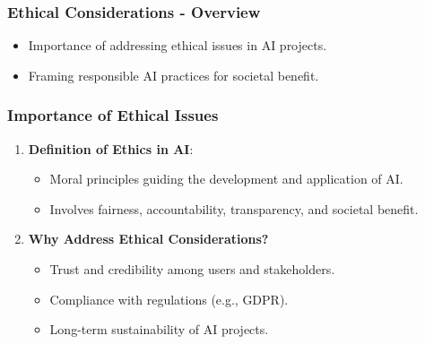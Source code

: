 \documentclass{beamer}
\begin{document}
\begin{frame}[fragile]
    \frametitle{Ethical Considerations - Overview}
    \begin{itemize}
        \item Importance of addressing ethical issues in AI projects.
        \item Framing responsible AI practices for societal benefit.
    \end{itemize}
\end{frame}

\begin{frame}[fragile]
    \frametitle{Importance of Ethical Issues}
    \begin{enumerate}
        \item \textbf{Definition of Ethics in AI}:
        \begin{itemize}
            \item Moral principles guiding the development and application of AI.
            \item Involves fairness, accountability, transparency, and societal benefit.
        \end{itemize}
        
        \item \textbf{Why Address Ethical Considerations?}
        \begin{itemize}
            \item Trust and credibility among users and stakeholders.
            \item Compliance with regulations (e.g., GDPR).
            \item Long-term sustainability of AI projects.
        \end{itemize}
    \end{enumerate}
\end{frame}
\end{document}
